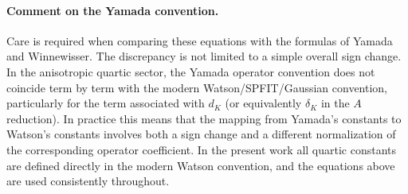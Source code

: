 \paragraph{Comment on the Yamada convention.}

Care is required when comparing these equations with the formulas of Yamada and
Winnewisser.\cite{Yamada1976}  The discrepancy is not limited to a simple
overall sign change.  In the anisotropic quartic sector, the Yamada operator
convention does not coincide term by term with the modern
Watson/SPFIT/Gaussian convention, particularly for the term associated with
$d_K$ (or equivalently $\delta_K$ in the $A$ reduction).  In practice this
means that the mapping from Yamada's constants to Watson's constants involves
both a sign change and a different normalization of the corresponding operator
coefficient.  In the present work all quartic constants are defined directly in
the modern Watson convention, and the equations above are used consistently
throughout.

